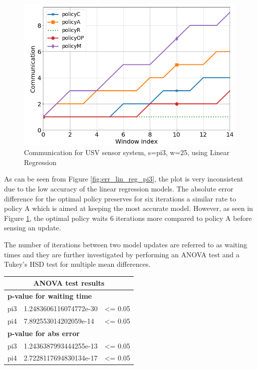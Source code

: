 \documentclass{mpaper}
\begin{document}
\begin{figure}[h]
    \centering
    \includegraphics[scale=0.33]{imgs/comm_lin_reg_pi3.png}
    \caption{Communication for USV sensor system, s=pi3, w=25, using Linear Regression}
    \label{fig:comm_lin_reg_pi3}
\end{figure}

As can be seen from Figure \ref{fig:err_lin_reg_pi3}, the plot is very inconsistent due to the low accuracy of the linear regression models. The absolute error difference for the optimal policy preserves for six iterations a similar rate to policy A which is aimed at keeping the most accurate model. However, as seen in Figure \ref{fig:comm_lin_reg_pi3}, the optimal policy waits 6 iterations more compared to policy A before sensing an update.  

The number of iterations between two model updates are referred to as waiting times and they are further investigated by performing an ANOVA test and a Tukey's HSD test for multiple mean differences. 
\begin{table}[]
\begin{tabular}{|l|l|l|}
\hline
\multicolumn{3}{|c|}{\cellcolor[HTML]{DAE8FC}\textbf{ANOVA test results}}       \\ \hline
\multicolumn{3}{|l|}{\cellcolor[HTML]{FFFFFF}\textbf{p-value for waiting time}} \\ \hline
pi3    & 1.2483606116074772e-30   & \textless{}= 0.05                           \\ \hline
pi4    & 7.892553014202059e-14    & \textless{}= 0.05                           \\ \hline
\multicolumn{3}{|l|}{\cellcolor[HTML]{FFFFFF}\textbf{p-value for abs error}}    \\ \hline
pi3    & 1.2436387993444255e-13   & \textless{}= 0.05                           \\ \hline
pi4    & 2.7228117694830134e-17   & \cellcolor[HTML]{FFFFFF}\textless{}= 0.05   \\ \hline
\end{tabular}
\end{table}
\end{document}
